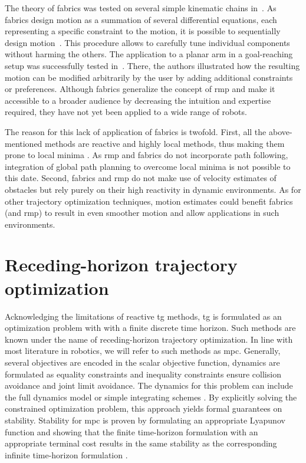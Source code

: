 The theory of \ac{fabrics} was tested on several simple
kinematic chains in~\cite{Ratliff2020,Ratliff2021}. As
\ac{fabrics} design motion as a summation of several
differential equations, each representing a specific
constraint to the motion, it is possible to sequentially
design motion~\cite{Ratliff2020}. This procedure allows to
carefully tune individual components without harming the
others. The application to a planar arm in a goal-reaching
setup was successfully tested in~\cite{Ratliff2020}. There,
the authors illustrated how the resulting motion can be
modified arbitrarily by the user by adding additional
constraints or preferences. Although \ac{fabrics} generalize
the concept of \ac{rmp} and make it accessible to a broader
audience by decreasing the intuition and expertise required,
they have not yet been applied to a wide range of robots. 

The reason for this lack of application of \ac{fabrics} is
twofold. First, all the above-mentioned methods are reactive
and highly local methods, thus making them prone to local
minima \cite{bhardwaj2022storm}. As \ac{rmp} and
\ac{fabrics} do not incorporate path following, integration
of global path planning to overcome local minima is not
possible to this date. Second, \ac{fabrics} and \ac{rmp} do
not make use of velocity estimates of obstacles but rely
purely on their high reactivity in dynamic environments. As
for other trajectory optimization techniques, motion
estimates could benefit \ac{fabrics} (and \ac{rmp}) to
result in even smoother motion and allow applications in
such environments. 


\section{Receding-horizon trajectory optimization}%
\label{sec:receding_horizon_trajectory_optimization}

Acknowledging the limitations of reactive \ac{tg} methods,
\ac{tg} is formulated as an optimization problem with with a
finite discrete time horizon. Such methods are known under
the name of receding-horizon trajectory optimization. In
line with most literature in robotics, we will refer to such
methods as \acf{mpc}.
Generally, several objectives are encoded in the scalar
objective function, dynamics
are formulated as equality constraints and inequality constraints ensure
collision avoidance and joint limit avoidance. The dynamics for this problem can
include the full dynamics model or simple integrating
schemes \cite{hewing2020learning}.
By explicitly solving the constrained optimization problem, this approach yields
formal guarantees on stability. Stability for \ac{mpc} is proven by formulating
an appropriate Lyapunov function and showing that the finite time-horizon
formulation with an appropriate terminal cost results in the same stability as
the corresponding infinite time-horizon formulation
\cite{l1,l4,keerthi1988optimal}. 

